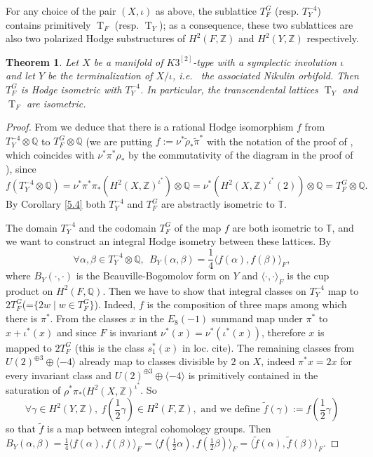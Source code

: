 \documentclass{amsart}
\newtheorem{thm}{Theorem}[section]
\theoremstyle{definition}
\numberwithin{equation}{section}
\numberwithin{equation}{section} \theoremstyle{definition}
\DeclareMathOperator{\T}{T}
\newcommand\Q{\mathbb Q}
\newcommand\Z{\mathbb{Z}}
\begin{document}
For any choice of the pair $(X,\iota)$ as above, the sublattice $T_F^G$ (resp. $T_Y^{-4}$) contains primitively $\T_F$ (resp. $\T_Y$); as a consequence, these two sublattices are also two polarized Hodge substructures of $H^2(F,\Z)$ and $H^2(Y,\Z)$ respectively.
\begin{thm}\label{them: proof of the conj} 
Let $X$ be a  manifold of $K3^{[2]}$-type with a symplectic involution $\iota$ and let $Y$ be the terminalization of $X/\iota$, i.e.~ the associated Nikulin orbifold. Then $T_F^{G}$ is Hodge isometric with $T_Y^{-4}$.  
In particular, the transcendental lattices $\T_Y$ and $\T_F$ are isometric.
\end{thm}
\begin{proof}
 From \cite[Proposition 3.16]{CGKK}
 we deduce that there is a rational Hodge isomorphism $f$ from $T_Y^{-4}\otimes \Q$ to $T_F^{G}\otimes \Q$ (we are putting $f:=\nu^*\tilde{\rho}_*\tilde{\pi}^*$ with the notation of the proof of \cite[Proposition 3.16]{CGKK}, which coincides with $\nu^*\pi^*\rho_*$ by the commutativity of the diagram in the proof of \cite[Proposition 3.16]{CGKK}), since $$f(T^{-4}_Y\otimes \Q)=\nu^*\pi^*\pi_*(H^2(X,\Z)^{\iota^*})\otimes \Q=\nu^*(H^2(X,\Z)^{\iota^*}(2))\otimes \Q=T_F^G\otimes \Q.$$ %
 By Corollary \ref{5.4} both $T_Y^{-4}$ and $T_F^{G}$ are abstractly isometric to $\mathbb{T}$. 

 The domain $T_Y^{-4}$ and the codomain $T_F^{G}$ of the map $f$ are both isometric to $\mathbb{T}$, and we want to construct an integral Hodge isometry between these lattices. By \cite[Proposition 3.16]{CGKK}  $$\forall\alpha, \beta\in T_Y^{-4}\otimes \Q,\ \ B_Y(\alpha,\beta)=\frac{1}{4}\langle f(\alpha), f(\beta)\rangle_F,$$ where $B_Y(\cdot,\cdot)$ is the Beauville-Bogomolov form on $Y$ and $\langle\cdot ,\cdot\rangle_F$ is the cup product on $H^2(F,\Q)$.
Then we have to show that integral classes on $T_Y^{-4}$ map to $2T_F^G$(=$\{2w\mid w\in T_F^G\}$). Indeed, $f$ is the composition of three maps among which there is $\pi^*$.  
From \cite[page 19]{Menet} the classes $x$ in the $E_8(-1)$ summand map under $\pi^*$ to $x+\iota^*(x)$ and since $F$ is invariant $\nu^*(x)=\nu^*(\iota^*(x))$, therefore $x$ is mapped to $2T_F^G$ (this is the class $s^{\ast}_1(x)$ in loc. cite). The remaining classes from $U(2)^{\oplus 3}\oplus \langle-4\rangle$ already map to classes divisible by $2$ on $X$, indeed $\pi^*x=2x$ for every invariant class and $U(2)^{\oplus 3}\oplus \langle-4\rangle$ is primitively contained in the saturation of $\rho^*\pi_*(H^2(X,\Z)^{\iota^*}$.
So $$\forall\gamma\in H^2(Y,\Z),\ f\left(\frac{1}{2}\gamma\right)\in H^2(F,\Z),\mbox{ and  we define }\tilde{f}(\gamma):=f\left(\frac{1}{2}\gamma\right)$$ so that $\tilde{f}$ is a map between integral cohomology groups.
Then $B_Y(\alpha,\beta)=\frac{1}{4}\langle f(\alpha),f(\beta)\rangle_F=\langle f(\frac{1}{2}\alpha), f(\frac{1}{2}\beta)\rangle_F=\langle\tilde{f}(\alpha), \tilde{f}(\beta)\rangle_F$.


\end{proof}
\end{document}
